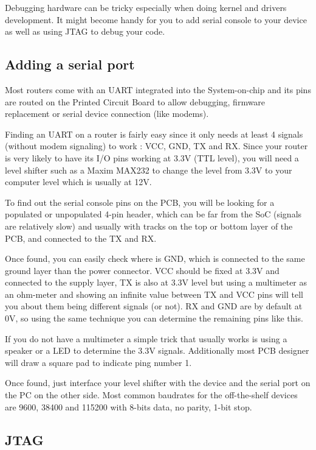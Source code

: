 Debugging hardware can be tricky especially when doing kernel and drivers
development. It might become handy for you to add serial console to your
device as well as using JTAG to debug your code.

\subsection{Adding a serial port}

Most routers come with an UART integrated into the System-on-chip
and its pins are routed on the Printed Circuit Board to allow
debugging, firmware replacement or serial device connection (like
modems).

Finding an UART on a router is fairly easy since it only needs at
least 4 signals (without modem signaling) to work : VCC, GND, TX and
RX. Since your router is very likely to have its I/O pins working at
3.3V (TTL level), you will need a level shifter such as a Maxim MAX232
to change the level from 3.3V to your computer level which is usually
at 12V.

To find out the serial console pins on the PCB, you will be looking
for a populated or unpopulated 4-pin header, which can be far from
the SoC (signals are relatively slow) and usually with tracks on
the top or bottom layer of the PCB, and connected to the TX and RX.

Once found, you can easily check where is GND, which is connected to
the same ground layer than the power connector. VCC should be fixed
at 3.3V and connected to the supply layer, TX is also at 3.3V level
but using a multimeter as an ohm-meter and showing an infinite
value between TX and VCC pins will tell you about them being different
signals (or not). RX and GND are by default at 0V, so using the same
technique you can determine the remaining pins like this.

If you do not have a multimeter a simple trick that usually works is
using a speaker or a LED to determine the 3.3V signals. Additionally
most PCB designer will draw a square pad to indicate ping number 1.

Once found, just interface your level shifter with the device and the
serial port on the PC on the other side. Most common baudrates for the
off-the-shelf devices are 9600, 38400 and 115200 with 8-bits data, no
parity, 1-bit stop.

\subsection{JTAG}

